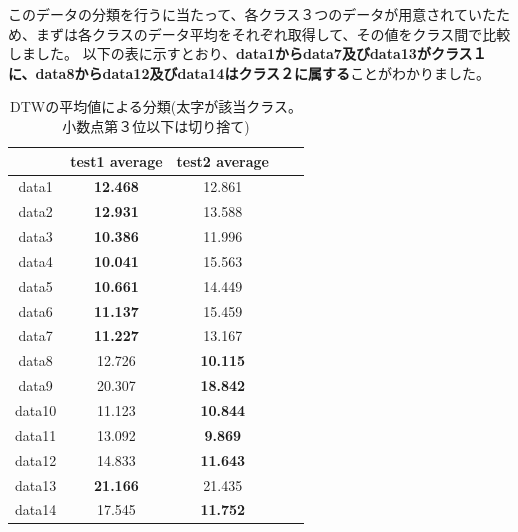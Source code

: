このデータの分類を行うに当たって、各クラス３つのデータが用意されていたため、まずは各クラスのデータ平均をそれぞれ取得して、その値をクラス間で比較しました。
以下の表に示すとおり、\textbf{data1からdata7及びdata13がクラス１に、data8からdata12及びdata14はクラス２に属する}ことがわかりました。
\begin{table}[htb]
\centering
\caption{DTWの平均値による分類(太字が該当クラス。小数点第３位以下は切り捨て)}
\begin{tabular}{|c|c|c|c|c|} \hline
 & test1 average & test2 average \\ \hline \hline
data1 & \textbf{12.468} & 12.861 \\ \hline
data2 & \textbf{12.931} & 13.588 \\ \hline
data3 & \textbf{10.386} & 11.996 \\ \hline
data4 & \textbf{10.041} & 15.563 \\ \hline
data5 & \textbf{10.661} & 14.449 \\ \hline
data6 & \textbf{11.137} & 15.459 \\ \hline
data7 & \textbf{11.227} & 13.167 \\ \hline
data8 & 12.726 & \textbf{10.115} \\ \hline
data9 & 20.307 & \textbf{18.842} \\ \hline
data10 & 11.123 & \textbf{10.844} \\ \hline
data11 & 13.092 & \textbf{9.869} \\ \hline
data12 & 14.833 & \textbf{11.643} \\ \hline
data13 & \textbf{21.166} & 21.435 \\ \hline
data14 & 17.545 & \textbf{11.752} \\ \hline
\end{tabular}
\end{table}

